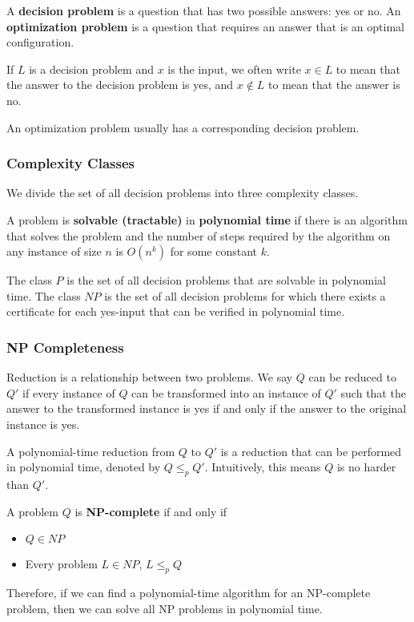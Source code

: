 \documentclass[a4paper,12pt]{article}
\begin{document}
A \textbf{decision problem} is a question that has two possible answers: yes or no.
An \textbf{optimization problem} is a question that requires an answer that is an optimal configuration.

If $L$ is a decision problem and $x$ is the input, we often write $x \in L$ to mean that the answer to the decision problem is yes, and $x \notin L$ to mean that the answer is no.

An optimization problem usually has a corresponding decision problem.

\subsubsection{Complexity Classes}

We divide the set of all decision problems into three complexity classes.

A problem is \textbf{solvable (tractable)} in \textbf{polynomial time} if there is an algorithm that solves the problem and the number of steps required by the algorithm on any instance of size $n$ is $O(n^k)$ for some constant $k$.

The class $P$ is the set of all decision problems that are solvable in polynomial time.
The class $NP$ is the set of all decision problems for which there exists a certificate for each yes-input that can be verified in polynomial time.

\subsubsection{NP Completeness}

Reduction is a relationship between two problems.
We say $Q$ can be reduced to $Q'$ if every instance of $Q$ can be transformed into an instance of $Q'$ such that the answer to the transformed instance is yes if and only if the answer to the original instance is yes.

A polynomial-time reduction from $Q$ to $Q'$ is a reduction that can be performed in polynomial time, denoted by $Q \leq_p Q'$.
Intuitively, this means $Q$ is no harder than $Q'$.

A problem $Q$ is \textbf{NP-complete} if and only if
\begin{itemize}
	\item $Q \in NP$
	\item Every problem $L \in NP$, $L \leq_p Q$
\end{itemize}

Therefore, if we can find a polynomial-time algorithm for an NP-complete problem, then we can solve all NP problems in polynomial time.
\end{document}
